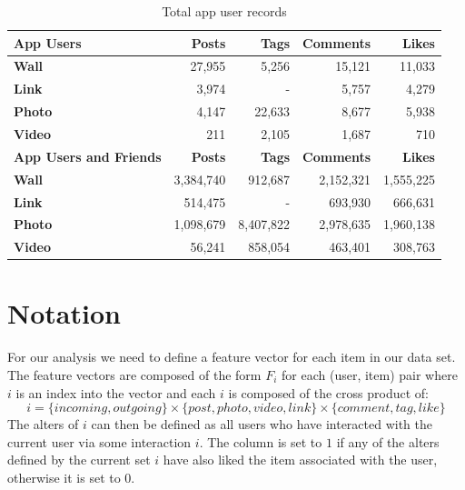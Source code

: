 \begin{table}[!htbp]
\centering
	\begin{tabular}{|l|r|r|r|r|} %
		\hline
		\textbf{App Users} & \textbf{Posts} & \textbf{Tags} & \textbf{Comments} & \textbf{Likes}  \\ \hline
		\textbf{Wall} & 27,955 & 5,256 & 15,121 & 11,033 \\ \hline
		\textbf{Link} & 3,974 & - & 5,757 & 4,279 \\ \hline
		\textbf{Photo} & 4,147 & 22,633 & 8,677 & 5,938 \\ \hline
		\textbf{Video} & 211 & 2,105 & 1,687 & 710 \\ \hline
		 \hline
		\textbf{App Users and Friends} & \textbf{Posts} & \textbf{Tags} & \textbf{Comments} & \textbf{Likes}  \\ \hline
		\textbf{Wall} & 3,384,740 & 912,687 & 2,152,321 & 1,555,225 \\ \hline
		\textbf{Link} & 514,475 & - & 693,930 & 666,631 \\ \hline
		\textbf{Photo} & 1,098,679 & 8,407,822 & 2,978,635 & 1,960,138 \\ \hline
		\textbf{Video} & 56,241 & 858,054 & 463,401 & 308,763 \\ \hline
	\end{tabular}
	\caption{Total app user records}
	\label{tab:revpol}
\end{table}

\clearpage

\section{Notation}
\label{sec:notation}


For our analysis we need to define a feature vector for each item in our data set. The feature vectors are composed of the form 
\( F_i \) for each (user, item) pair where \( i \) is an index into the vector and each \( i \) is composed of the cross product of:
\[ i = \{incoming, outgoing\} \times \{post,photo,video,link\} \times \{comment,tag,like\} \]
The alters of \( i \) can then be defined as all users who have interacted with the current user via some interaction \( i \). The column is 
set to \( 1 \) if any of the alters defined by the current set \( i \) have also liked the item associated with the user, otherwise it is set to \( 0 \).

